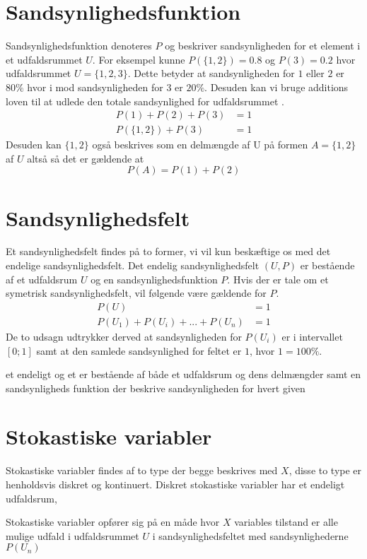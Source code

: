 \documentclass[../../SRP.tex]{subfiles}
\begin{document}
\section{Sandsynlighedsfunktion}

Sandsynlighedsfunktion denoteres $P$ og beskriver sandsynligheden for et element i et udfaldsrummet $U$. For eksempel kunne $P(\{1,2\}) = 0.8$ og $P(3) = 0.2$ hvor udfaldsrummet $U = \{1,2,3\}$. Dette betyder at sandsynligheden for $1$ eller $2$ er $80\%$ hvor i mod sandsynligheden for $3$ er $20\%$. Desuden kan vi bruge additions loven til at udlede den totale sandsynlighed for udfaldsrummet \cite{SC}.
\begin{align}
  P(1) + P(2) + P(3) &= 1 \\
  P(\{1,2\}) + P(3) &= 1
\end{align}
Desuden kan $\{1,2\}$ også beskrives som en delmængde af U på formen $A = \{1,2\}$ af $U$ altså så det er gældende at
\begin{equation}
  P(A) = P(1) + P(2)
\end{equation}

\section{Sandsynlighedsfelt}

Et sandsynlighedsfelt findes på to former, vi vil kun beskæftige os med det endelige sandsynlighedsfelt. Det endelig sandsynlighedsfelt $(U, P)$ er bestående af et udfaldsrum $U$ og en sandsynlighedsfunktion $P$. Hvis der er tale om et symetrisk sandsynlighedsfelt, vil følgende være gældende for $P$.
\begin{align}
  P(U) &= 1 \\
  P(U_1) + P(U_i) + ... + P(U_n) &= 1
\end{align}
De to udsagn udtrykker derved at sandsynligheden for $P(U_i)$ er i intervallet $[0;1]$ samt at den samlede sandsynlighed for feltet er $1$, hvor $1 = 100\%$. 

 et endeligt og et  er bestående af både et udfaldsrum og dens delmængder samt en sandsynligheds funktion der beskrive sandsynligheden for hvert given  \cite{SC}

\section{Stokastiske variabler}

Stokastiske variabler findes af to type der begge beskrives med $X$, disse to type er henholdsvis diskret og kontinuert. Diskret stokastiske variabler har et endeligt udfaldsrum,

Stokastiske variabler opfører sig på en måde hvor $X$ variables tilstand er alle mulige udfald i udfaldsrummet $U$ i sandsynlighedsfeltet med sandsynlighederne $P(U_n)$
\end{document}
